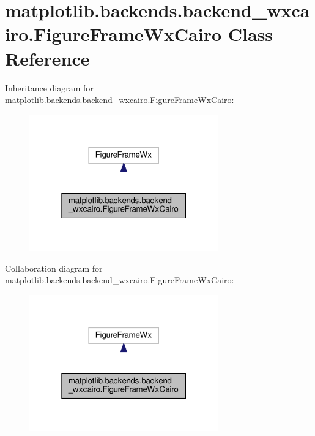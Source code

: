 \hypertarget{classmatplotlib_1_1backends_1_1backend__wxcairo_1_1FigureFrameWxCairo}{}\section{matplotlib.\+backends.\+backend\+\_\+wxcairo.\+Figure\+Frame\+Wx\+Cairo Class Reference}
\label{classmatplotlib_1_1backends_1_1backend__wxcairo_1_1FigureFrameWxCairo}


Inheritance diagram for matplotlib.\+backends.\+backend\+\_\+wxcairo.\+Figure\+Frame\+Wx\+Cairo\+:
\nopagebreak
\begin{figure}[H]
\begin{center}
\leavevmode
\includegraphics[width=232pt]{classmatplotlib_1_1backends_1_1backend__wxcairo_1_1FigureFrameWxCairo__inherit__graph}
\end{center}
\end{figure}


Collaboration diagram for matplotlib.\+backends.\+backend\+\_\+wxcairo.\+Figure\+Frame\+Wx\+Cairo\+:
\nopagebreak
\begin{figure}[H]
\begin{center}
\leavevmode
\includegraphics[width=232pt]{classmatplotlib_1_1backends_1_1backend__wxcairo_1_1FigureFrameWxCairo__coll__graph}
\end{center}
\end{figure}
